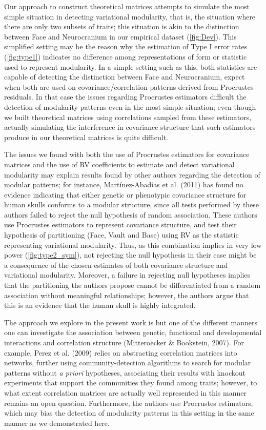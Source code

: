 \documentclass[12pt,twoside]{report}
\begin{document}
Our approach to construct theoretical matrices attempts to simulate the
most simple situation in detecting variational modularity, that is, the
situation where there are only two subsets of traits; this situation is
akin to the distinction between Face and Neurocranium in our empirical
dataset (\autoref{fig:Dev}). This simplified setting may be the reason
why the estimation of Type I error rates (\autoref{fig:type1}) indicates
no difference among representations of form or statistic used to
represent modularity. In a simple setting such as this, both statistics
are capable of detecting the distinction between Face and Neurocranium,
expect when both are used on covariance/correlation patterns derived
from Procrustes residuals. In that case the issues regarding Procrustes
estimators difficult the detection of modularity patterns even in the
most simple situation; even though we built theoretical matrices using
correlations sampled from these estimators, actually simulating the
interference in covariance structure that such estimators produce in our
theoretical matrices is quite difficult.

The issues we found with both the use of Procrustes estimators for
covariance matrices and the use of RV coefficients to estimate and
detect variational modularity may explain results found by other authors
regarding the detection of modular patterns; for instance,
Martínez-Abadías et al. (2011) has found no evidence indicating that
either genetic or phenotypic covariance structure for human skulls
conforms to a modular structure, since all tests performed by these
authors failed to reject the null hypothesis of random association.
These authors use Procrustes estimators to represent covariance
structure, and test their hypothesis of partitioning (Face, Vault and
Base) using RV as the statistic representing variational modularity.
Thus, as this combination implies in very low power
(\autoref{fig:type2_sym}), not rejecting the null hypothesis in their
case might be a consequence of the chosen estimates of both covariance
structure and variational modularity. Moreover, a failure in rejecting
null hypotheses implies that the partitioning the authors propose cannot
be differentiated from a random association without meaningful
relationships; however, the authors argue that this is an evidence that
the human skull is highly integrated.

The approach we explore in the present work is but one of the different
manners one can investigate the association between genetic, functional
and developmental interactions and correlation structure (Mitteroecker
\& Bookstein, 2007). For example, Perez et al. (2009) relies on
abstracting correlation matrices into networks, further using
community-detection algorithms to search for modular patterns without
\emph{a priori} hypotheses, associating their results with knockout
experiments that support the communities they found among traits;
however, to what extent correlation matrices are actually well
represented in this manner remains an open question. Furthermore, the
authors use Procrustes estimators, which may bias the detection of
modularity patterns in this setting in the same manner as we
demonstrated here.
\end{document}
